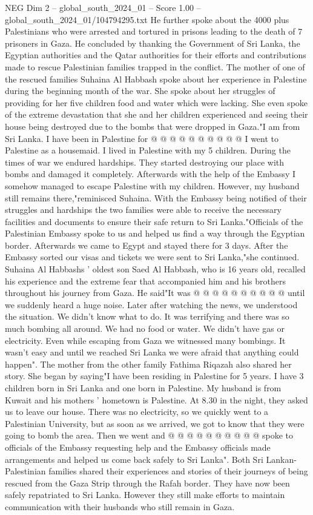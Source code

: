 \begin{textsample}{NEG Dim 2 – global\_south\_2024\_01 – Score 1.00 – global\_south\_2024\_01/104794295.txt}
He further spoke about the 4000 plus Palestinians who were arrested and tortured in prisons leading to the death of 7 prisoners in Gaza.
He concluded by thanking the Government of Sri Lanka, the Egyptian authorities and the Qatar authorities for their efforts and contributions made to rescue Palestinian families trapped in the conflict.
The mother of one of the rescued families Suhaina Al Habbash spoke about her experience in Palestine during the beginning month of the war.
She spoke about her struggles of providing for her five children food and water which were lacking.
She even spoke of the extreme devastation that she and her children experienced and seeing their house being destroyed due to the bombs that were dropped in Gaza."I am from Sri Lanka.
I have been in Palestine for @ @ @ @ @ @ @ @ @ @ I went to Palestine as a housemaid.
I lived in Palestine with my 5 children.
During the times of war we endured hardships.
They started destroying our place with bombs and damaged it completely.
Afterwards with the help of the Embassy I somehow managed to escape Palestine with my children.
However, my husband still remains there,"reminisced Suhaina.
With the Embassy being notified of their struggles and hardships the two families were able to receive the necessary facilities and documents to ensure their safe return to Sri Lanka."Officials of the Palestinian Embassy spoke to us and helped us find a way through the Egyptian border.
Afterwards we came to Egypt and stayed there for 3 days.
After the Embassy sorted our visas and tickets we were sent to Sri Lanka,"she continued.
Suhaina Al Habbashs ' oldest son Saed Al Habbash, who is 16 years old, recalled his experience and the extreme fear that accompanied him and his brothers throughout his journey from Gaza.
He said"It was @ @ @ @ @ @ @ @ @ @ until we suddenly heard a huge noise.
Later after watching the news, we understood the situation.
We didn't know what to do.
It was terrifying and there was so much bombing all around.
We had no food or water.
We didn't have gas or electricity.
Even while escaping from Gaza we witnessed many bombings.
It wasn't easy and until we reached Sri Lanka we were afraid that anything could happen".
The mother from the other family Fathima Riqazah also shared her story.
She began by saying"I have been residing in Palestine for 5 years.
I have 3 children born in Sri Lanka and one born in Palestine.
My husband is from Kuwait and his mothers ' hometown is Palestine.
At 8.30 in the night, they asked us to leave our house.
There was no electricity, so we quickly went to a Palestinian University, but as soon as we arrived, we got to know that they were going to bomb the area.
Then we went and @ @ @ @ @ @ @ @ @ @ spoke to officials of the Embassy requesting help and the Embassy officials made arrangements and helped us come back safely to Sri Lanka".
Both Sri Lankan-Palestinian families shared their experiences and stories of their journeys of being rescued from the Gaza Strip through the Rafah border.
They have now been safely repatriated to Sri Lanka.
However they still make efforts to maintain communication with their husbands who still remain in Gaza.

\end{textsample}
